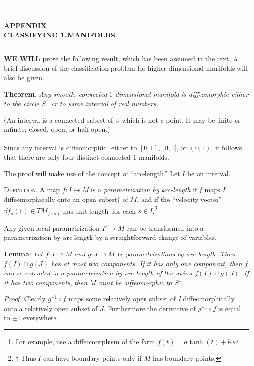 
\begin{center}
\rule{0.8\textwidth}{0.4pt}\\[0.6em]
{\large\bfseries APPENDIX}\\[0.3em]
{\Large\bfseries CLASSIFYING 1-MANIFOLDS}\\[0.6em]
\rule{0.8\textwidth}{0.4pt}
\end{center}

\noindent\textbf{WE WILL} prove the following result, which has been assumed in the text. A brief discussion of the classification problem for higher dimensional manifolds will also be given.

\noindent\textbf{Theorem.} \textit{Any smooth, connected $1$-dimensional manifold is diffeomorphic either to the circle $S^1$ or to some interval of real numbers.}

(An interval is a connected subset of $\mathbb{R}$ which is not a point. It may be finite or infinite; closed, open, or half-open.)

Since any interval is diffeomorphic\footnote{For example, use a diffeomorphism of the form $f(t) = a \tanh(t) + b$.} either to $[0, 1]$, $(0, 1]$, or $(0, 1)$, it follows that there are only four distinct connected $1$-manifolds.

The proof will make use of the concept of ``arc-length.'' Let $I$ be an interval.

\textsc{Definition.} A map $f : I \to M$ is a \emph{parametrization by arc-length} if $f$ maps $I$ diffeomorphically onto an open subset$\dagger$ of $M$, and if the ``velocity vector'' $\dd f_s(1) \in TM_{f(s)}$ has unit length, for each $s \in I$.\footnote{$\dagger$ Thus $I$ can have boundary points only if $M$ has boundary points.}

Any given local parametrization $I' \to M$ can be transformed into a parametrization by arc-length by a straightforward change of variables.

\noindent\textbf{Lemma.} \textit{Let $f : I \to M$ and $g : J \to M$ be parametrizations by arc-length. Then $f(I) \cap g(J)$ has at most two components. If it has only one component, then $f$ can be extended to a parametrization by arc-length of the union $f(I) \cup g(J)$. If it has two components, then $M$ must be diffeomorphic to $S^1$.}




\noindent\textit{Proof.}
Clearly $g^{-1} \circ f$ maps some relatively open subset of $I$ diffeomorphically onto a relatively open subset of $J$. Furthermore the derivative of $g^{-1} \circ f$ is equal to $\pm 1$ everywhere.

